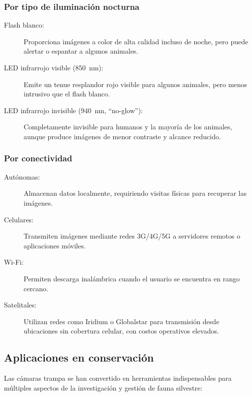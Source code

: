 \documentclass[a4paper, 12pt]{report}
\begin{document}
\subsubsection{Por tipo de iluminación nocturna}
\begin{description}
  \item[Flash blanco:] Proporciona imágenes a color de alta calidad incluso
    de noche, pero puede alertar o espantar a algunos animales.
  \item[LED infrarrojo visible (\qty{850}{nm}):] Emite un tenue resplandor rojo
    visible para algunos animales, pero menos intrusivo que el flash
    blanco.
  \item[LED infrarrojo invisible (\qty{940}{nm}, ``no-glow''):] Completamente invisible
    para humanos y la mayoría de los animales, aunque produce imágenes
    de menor contraste y alcance reducido.
\end{description}

\subsubsection{Por conectividad}
\begin{description}
  \item[Autónomas:] Almacenan datos localmente, requiriendo visitas físicas
    para recuperar las imágenes.
  \item[Celulares:] Transmiten imágenes mediante redes 3G/4G/5G a servidores
    remotos o aplicaciones móviles.
  \item[Wi-Fi:] Permiten descarga inalámbrica cuando el usuario se encuentra
    en rango cercano.
  \item[Satelitales:] Utilizan redes como Iridium o Globalstar para transmisión
    desde ubicaciones sin cobertura celular, con costos operativos elevados.
\end{description}

\subsection{Aplicaciones en conservación}

Las cámaras trampa se han convertido en herramientas indispensables para
múltiples aspectos de la investigación y gestión de fauna silvestre:
\end{document}
